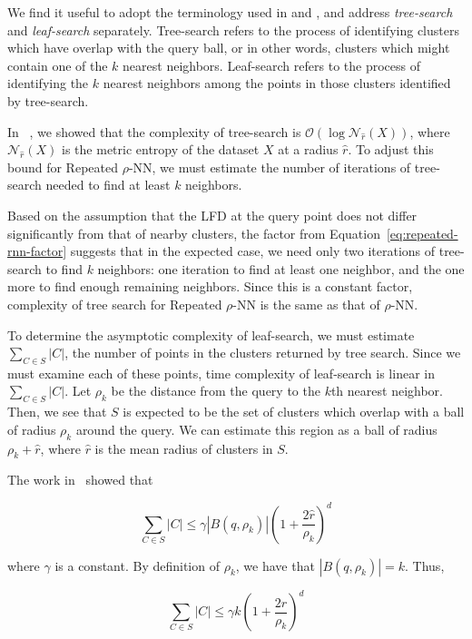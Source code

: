 We find it useful to adopt the terminology used in \cite{ishaq2019clustered} and \cite{yu2015entropy}, and address \emph{tree-search} and \emph{leaf-search} separately.
Tree-search refers to the process of identifying clusters which have overlap with the query ball, or in other words, clusters which might contain one of the $k$ nearest neighbors. 
Leaf-search refers to the process of identifying the $k$ nearest neighbors among the points in those clusters identified by tree-search.

In ~\cite{ishaq2019clustered}, we showed that the complexity of tree-search is $\mathcal{O}(\log\mathcal{N}_{\hat{r}}(X))$, where $\mathcal{N}_{\hat{r}}(X)$ is the metric entropy of the dataset $X$ at a radius $\hat{r}$.
To adjust this bound for Repeated $\rho$-NN, we must estimate the number of iterations of tree-search needed to find at least $k$ neighbors.

Based on the assumption that the LFD at the query point does not differ significantly from that of nearby clusters, the factor from Equation~\ref{eq:repeated-rnn-factor} suggests that in the expected case, we need only two iterations of tree-search to find $k$ neighbors:
one iteration to find at least one neighbor, and the one more to find enough remaining neighbors.
Since this is a constant factor, complexity of tree search for Repeated $\rho$-NN is the same as that of $\rho$-NN.

To determine the asymptotic complexity of leaf-search, we must estimate $\sum_{C \in S} |C|$, the number of points in the clusters returned by tree search.
Since we must examine each of these points, time complexity of leaf-search is linear in $\sum_{C \in S} |C|$. 
Let $\rho_k$ be the distance from the query to the $k$th nearest neighbor.
Then, we see that $S$ is expected to be the set of clusters which overlap with a ball of radius $\rho_k$ around the query.
We can estimate this region as a ball of radius $\rho_k + \hat{r}$, where $\hat{r}$ is the mean radius of clusters in $S$.

The work in~\cite{yu2015entropy} showed that

\begin{equation*}
    \sum_{C \in S} |C| \leq \gamma  \left| B(q, \rho_k) \right| \left(1+ \frac{2\hat{r}}{\rho_k} \right)^d
\end{equation*}

where $\gamma$ is a constant. 
By definition of $\rho_k$, we have that $|B(q, \rho_k)| = k$.
Thus,

\begin{equation}
    \sum_{C \in S} |C| \leq \gamma k \left( 1+ \frac{2\hat{r}}{\rho_k} \right)^d
    \label{eq:methods:repeated-rnn-leaf-search}
\end{equation}


